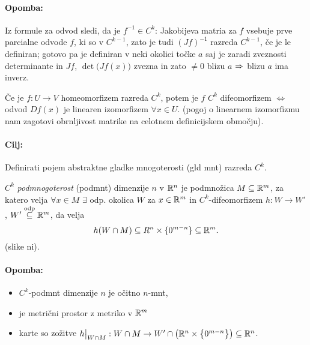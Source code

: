 \paragraph{Opomba:} Iz formule za odvod sledi, da je $f^{-1} \in C^k$: Jakobijeva matria za $f$ vsebuje prve parcialne odvode $f$, ki so v $C^{k-1}$,
zato je tudi $(Jf)^{-1}$ razreda $C^{k-1}$, \v ce je le definiran; gotovo pa je definiran v neki okolici to\v cke $a$ saj je zaradi zveznosti
determinante in $Jf$, $\det\big(Jf(x)\big)$ zvezna in zato $\neq 0$ blizu $a$ $\Rightarrow$ blizu $a$ ima inverz.

\begin{posledica}
	\v Ce je $f : U \to V$ homeomorfizem razreda $C^k$, potem je $f$ $C^k$ difeomorfizem $\iff$ odvod $Df(x)$ je linearen izomorfizem
	$\forall x \in U$. (pogoj o linearnem izomorfizmu nam zagotovi obrnljivost matrike na celotnem definicijskem obmo\v cju).
\end{posledica}

\paragraph{Cilj:} Definirati pojem abstraktne gladke mnogoterosti (gld mnt) razreda $C^k$.

\begin{defin}
	$C^k$ \emph{podmnogoterost} (podmnt) dimenzije $n$ v $\mathbb{R}^n$ je podmno\v zica $M \subseteq \mathbb{R}^m$, za katero velja $\forall x \in M$
	$\exists$ odp. okolica $W$ za $x \in \mathbb{R}^m$ in $C^k$-difeomorfizem $h : W \to W'$, $W' \stackrel{\text{odp}}{\subseteq} \mathbb{R}^m$, da velja
	\[
		h (W \cap M) \subseteq R^n \times \{0^{m-n}\} \subseteq \mathbb{R}^m.
	\]
	(slike ni).
\end{defin}
\paragraph{Opomba:}
\begin{itemize}
	\item{$C^k$-podmnt dimenzije $n$ je o\v citno $n$-mnt,}
	\item{je metri\v cni prostor z metriko v $\mathbb{R}^m$}
	\item{karte so zo\v zitve $h\big|_{W \cap M} : W \cap M \to W' \cap \big(\mathbb{R}^n \times \big\{0^{m - n}\big\}\big) \subseteq \mathbb{R}^n$.}
\end{itemize}

